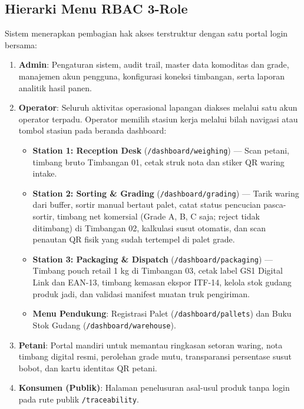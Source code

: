 \documentclass[12pt,a4paper]{article}
\begin{document}
\subsection{Hierarki Menu RBAC 3-Role}
Sistem menerapkan pembagian hak akses terstruktur dengan satu portal login bersama:
\begin{enumerate}
  \item \textbf{Admin}: Pengaturan sistem, audit trail, master data komoditas dan grade, manajemen akun pengguna, konfigurasi koneksi timbangan, serta laporan analitik hasil panen.
  \item \textbf{Operator}: Seluruh aktivitas operasional lapangan diakses melalui satu akun operator terpadu. Operator memilih stasiun kerja melalui bilah navigasi atau tombol stasiun pada beranda dashboard:
  \begin{itemize}
    \item \textbf{Station 1: Reception Desk} (\texttt{/dashboard/weighing}) --- Scan petani, timbang bruto Timbangan 01, cetak struk nota dan stiker QR waring intake.
    \item \textbf{Station 2: Sorting \& Grading} (\texttt{/dashboard/grading}) --- Tarik waring dari buffer, sortir manual bertaut palet, catat status pencucian pasca-sortir, timbang net komersial (Grade A, B, C saja; reject tidak ditimbang) di Timbangan 02, kalkulasi susut otomatis, dan scan penautan QR fisik yang sudah tertempel di palet grade.
    \item \textbf{Station 3: Packaging \& Dispatch} (\texttt{/dashboard/packaging}) --- Timbang pouch retail 1 kg di Timbangan 03, cetak label GS1 Digital Link dan EAN-13, timbang kemasan ekspor ITF-14, kelola stok gudang produk jadi, dan validasi manifest muatan truk pengiriman.
    \item \textbf{Menu Pendukung}: Registrasi Palet (\texttt{/dashboard/pallets}) dan Buku Stok Gudang (\texttt{/dashboard/warehouse}).
  \end{itemize}
  \item \textbf{Petani}: Portal mandiri untuk memantau ringkasan setoran waring, nota timbang digital resmi, perolehan grade mutu, transparansi persentase susut bobot, dan kartu identitas QR petani.
  \item \textbf{Konsumen (Publik)}: Halaman penelusuran asal-usul produk tanpa login pada rute publik \texttt{/traceability}.
\end{enumerate}
\end{document}
